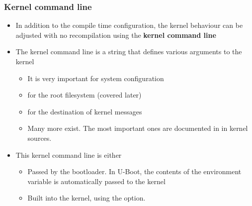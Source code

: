 \begin{frame}
  \frametitle{Kernel command line}
  \begin{itemize}
  \item In addition to the compile time configuration, the kernel
    behaviour can be adjusted with no recompilation using the {\bf
      kernel command line}
  \item The kernel command line is a string that defines various
    arguments to the kernel
    \begin{itemize}
    \item It is very important for system configuration
    \item {} for the root filesystem (covered later)
    \item {} for the destination of kernel messages
    \item Many more exist. The most important ones are documented
          in  in kernel sources.
    \end{itemize}
  \item This kernel command line is either
    \begin{itemize}
    \item Passed by the bootloader. In U-Boot, the contents of the
       environment variable is automatically passed to the
      kernel
    \item Built into the kernel, using the  option.
    \end{itemize}
  \end{itemize}
\end{frame}
